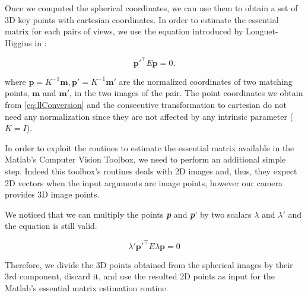 Once we computed the spherical coordinates, we can use them to obtain a set of 3D 
key points with cartesian coordinates. In order to estimate the essential 
matrix for each pairs of views, we use the equation introduced by 
Longuet-Higgins in \cite{longuet1981computer}:

\begin{equation}
\label{eq:essentialMatrix}
\mathbf{p}'^\top E\mathbf{p} = 0 \text{,}
\end{equation}

\noindent where 
\begin{math}\mathbf{p} = K^{-1} \mathbf{m},
\mathbf{p}' = K^{-1} \mathbf{m}'\end{math} are the normalized coordinates of 
two matching points, \begin{math}\mathbf{m}\end{math} and
\begin{math}\mathbf{m'}\end{math}, in the two images of the pair.
The point coordinates we obtain from \ref{eq:llConversion} and the consecutive 
transformation to cartesian do not need any normalization since they are not 
affected by any intrinsic parameter
(\begin{math}K = I\end{math}).

In order to exploit the routines to estimate the essential matrix available 
in the Matlab's Computer Vision Toolbox, we need to perform an additional simple 
step.
Indeed this toolbox's routines deals with 2D images and, thus, they expect 
2D vectors when the input arguments are image points, however our camera
provides 3D image points.

We noticed that we can multiply the points \textbf{\textit{p}}
and \textbf{\textit{p}}' by two 
scalars \begin{math}{\lambda}\end{math} and 
\begin{math}{\lambda}'\end{math} and the equation is still valid.

\begin{equation*}
\lambda'\mathbf{p}'^\top E\lambda\mathbf{p} = 0
\end{equation*}

Therefore, we divide the 3D points obtained from the spherical images by their 
3rd component, discard it, and use the resulted 2D points as input for the 
Matlab's essential matrix estimation routine.

